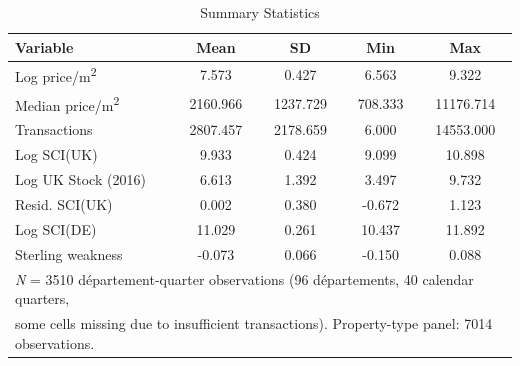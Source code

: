 \begin{table}[htbp]
\centering
\caption{Summary Statistics}
\label{tab:summary}
\begin{tabular}{lcccc}
\hline\hline
Variable & Mean & SD & Min & Max \\
\hline
Log price/m\textsuperscript{2} &    7.573 &    0.427 &   6.563 &     9.322 \\
Median price/m\textsuperscript{2} & 2160.966 & 1237.729 & 708.333 & 11176.714 \\
Transactions & 2807.457 & 2178.659 &   6.000 & 14553.000 \\
Log SCI(UK) &    9.933 &    0.424 &   9.099 &    10.898 \\
Log UK Stock (2016) &    6.613 &    1.392 &   3.497 &     9.732 \\
Resid. SCI(UK) &    0.002 &    0.380 &  -0.672 &     1.123 \\
Log SCI(DE) &   11.029 &    0.261 &  10.437 &    11.892 \\
Sterling weakness &   -0.073 &    0.066 &  -0.150 &     0.088 \\
\hline
\multicolumn{5}{l}{\footnotesize \textit{N} = 3510 d\'epartement-quarter observations (96 d\'epartements, 40 calendar quarters,} \\
\multicolumn{5}{l}{\footnotesize some cells missing due to insufficient transactions). Property-type panel: 7014 observations.} \\
\hline\hline
\end{tabular}
\end{table}

